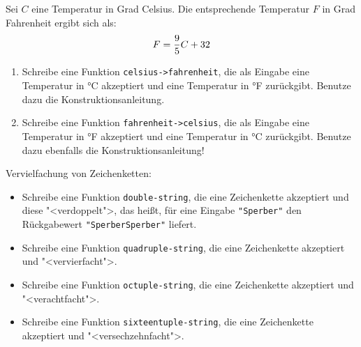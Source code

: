 \begin{aufgabe}
  Sei $C$ eine Temperatur in Grad Celsius.  Die
  entsprechende Temperatur $F$ in Grad Fahrenheit ergibt sich als:
  \begin{displaymath}
    F = {9 \over 5} C + 32
  \end{displaymath}
  
  \begin{enumerate} 
  \item Schreibe eine Funktion \lstinline{celsius->fahrenheit}, die als
    Eingabe eine Temperatur in \si{\degree}C akzeptiert und eine
    Temperatur in \si{\degree}F zurückgibt.  Benutze dazu die
    Konstruktionsanleitung.
    
  \item Schreibe eine Funktion \lstinline{fahrenheit->celsius}, die als
    Eingabe eine Temperatur in \si{\degree}F akzeptiert und eine
    Temperatur in \si{\degree}C zurückgibt.  Benutze dazu
    ebenfalls die Konstruktionsanleitung!
  \end{enumerate}
\end{aufgabe}  

\begin{aufgabe}
 Vervielfachung von Zeichenketten:
 \begin{itemize}
  \item Schreibe eine Funktion \lstinline{double-string}, die eine Zeichenkette akzeptiert und
    diese "<verdoppelt">, das heißt, für eine Eingabe \lstinline{"Sperber"} den
    Rückgabewert \lstinline{"SperberSperber"} liefert.
    
  \item Schreibe eine Funktion \lstinline{quadruple-string}, die eine
    Zeichenkette akzeptiert und "<vervierfacht">.

  \item Schreibe eine Funktion \lstinline{octuple-string}, die eine
    Zeichenkette akzeptiert und "<verachtfacht">.

  \item Schreibe eine Funktion \lstinline{sixteentuple-string}, die
    eine Zeichenkette akzeptiert und "<versechzehnfacht">.
  \end{itemize}


\end{aufgabe}

